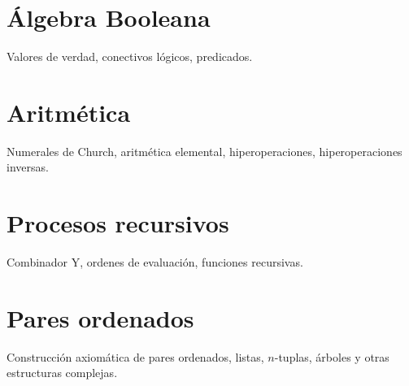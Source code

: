 \section{Álgebra Booleana}

Valores de verdad, conectivos lógicos, predicados.

\section{Aritmética}

Numerales de Church, aritmética elemental, hiperoperaciones, hiperoperaciones inversas.

\section{Procesos recursivos}

Combinador Y, ordenes de evaluación, funciones recursivas.

\section{Pares ordenados}

Construcción axiomática de pares ordenados, listas, \(n\)-tuplas, árboles y
otras estructuras complejas.


